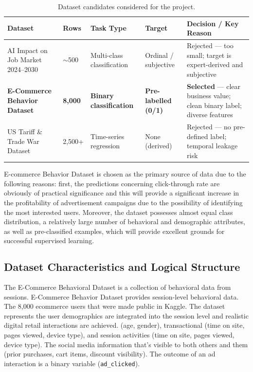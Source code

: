\documentclass[12pt,a4paper]{article}
\begin{document}
\begin{table}[H]
\centering
\caption{Dataset candidates considered for the project.}
\label{tab:candidates}
\footnotesize
\renewcommand{\arraystretch}{1.4}
\begin{tabularx}{\textwidth}{|L{2.8cm}|C{1.2cm}|L{2.5cm}|L{1.8cm}|Y|}
\hline
\textbf{Dataset} & \textbf{Rows} & \textbf{Task Type} & \textbf{Target} & \textbf{Decision / Key Reason} \\
\hline
AI Impact on Job Market 2024--2030 \cite{sahilislam2024}
  & $\sim$500 & Multi-class classification & Ordinal / subjective
  & Rejected --- too small; target is expert-derived and subjective \\
\hline
\textbf{E-Commerce Behavior Dataset} \cite{asifxzaman2024}
  & \textbf{8,000} & \textbf{Binary classification} & \textbf{Pre-labelled (0/1)}
  & \textbf{Selected} --- clear business value; clean binary label; diverse features \\
\hline
US Tariff \& Trade War Dataset \cite{belbino2024}
  & 2,500+ & Time-series regression & None (derived)
  & Rejected --- no pre-defined label; temporal leakage risk \\
\hline
\end{tabularx}
\end{table}


E-commerce Behavior Dataset is chosen as the primary source of data due to the following reasons: first, the predictions concerning click-through rate are obviously of practical significance and 
this will provide a significant increase in the profitability of advertisement campaigns due to the possibility of identifying the most interested users.
Moreover, the dataset possesses almost equal class distribution, a relatively large number of behavioral and demographic attributes, as well as pre-classified examples,
which will provide excellent grounds for successful supervised learning.



\subsection{Dataset Characteristics and Logical Structure}


The E-Commerce Behavioral Dataset \cite{asifxzaman2024} is a collection of behavioral data from sessions. E-Commerce Behavior Dataset provides session-level behavioral data.
The 8,000 ecommerce users that were made public in Kaggle. The dataset represents the user demographics are integrated into the session level and realistic digital retail interactions are achieved.
(age, gender), transactional (time on site, pages viewed, device type), and session activities (time on site, pages viewed, device type).
The social media information that's visible to both others and them (prior purchases, cart items, discount visibility).
The outcome of an ad interaction is a binary variable (\texttt{ad\_clicked}).
\end{document}
